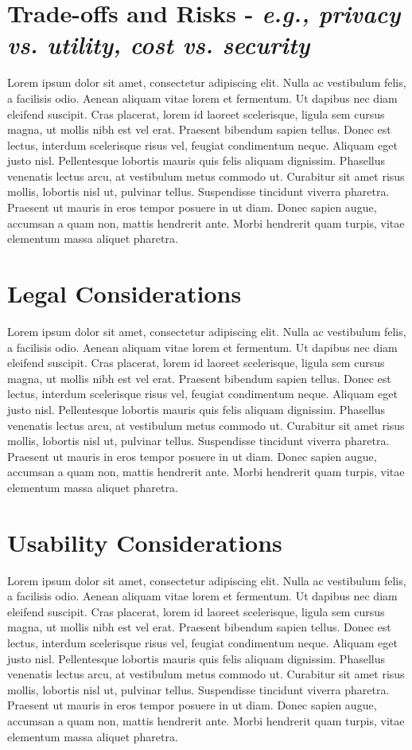 \documentclass[9pt]{extarticle}
\begin{document}
\section{Trade-offs and Risks - \textit{e.g., privacy vs. utility, cost vs. security}}
Lorem ipsum dolor sit amet, consectetur adipiscing elit. Nulla ac vestibulum felis, a facilisis odio. Aenean aliquam vitae lorem et fermentum. Ut dapibus nec diam eleifend suscipit. Cras placerat, lorem id laoreet scelerisque, ligula sem cursus magna, ut mollis nibh est vel erat. Praesent bibendum sapien tellus. Donec est lectus, interdum scelerisque risus vel, feugiat condimentum neque. Aliquam eget justo nisl. Pellentesque lobortis mauris quis felis aliquam dignissim. Phasellus venenatis lectus arcu, at vestibulum metus commodo ut. Curabitur sit amet risus mollis, lobortis nisl ut, pulvinar tellus. Suspendisse tincidunt viverra pharetra. Praesent ut mauris in eros tempor posuere in ut diam. Donec sapien augue, accumsan a quam non, mattis hendrerit ante. Morbi hendrerit quam turpis, vitae elementum massa aliquet pharetra. 

\section{Legal Considerations}
Lorem ipsum dolor sit amet, consectetur adipiscing elit. Nulla ac vestibulum felis, a facilisis odio. Aenean aliquam vitae lorem et fermentum. Ut dapibus nec diam eleifend suscipit. Cras placerat, lorem id laoreet scelerisque, ligula sem cursus magna, ut mollis nibh est vel erat. Praesent bibendum sapien tellus. Donec est lectus, interdum scelerisque risus vel, feugiat condimentum neque. Aliquam eget justo nisl. Pellentesque lobortis mauris quis felis aliquam dignissim. Phasellus venenatis lectus arcu, at vestibulum metus commodo ut. Curabitur sit amet risus mollis, lobortis nisl ut, pulvinar tellus. Suspendisse tincidunt viverra pharetra. Praesent ut mauris in eros tempor posuere in ut diam. Donec sapien augue, accumsan a quam non, mattis hendrerit ante. Morbi hendrerit quam turpis, vitae elementum massa aliquet pharetra. 

\section{Usability Considerations}
Lorem ipsum dolor sit amet, consectetur adipiscing elit. Nulla ac vestibulum felis, a facilisis odio. Aenean aliquam vitae lorem et fermentum. Ut dapibus nec diam eleifend suscipit. Cras placerat, lorem id laoreet scelerisque, ligula sem cursus magna, ut mollis nibh est vel erat. Praesent bibendum sapien tellus. Donec est lectus, interdum scelerisque risus vel, feugiat condimentum neque. Aliquam eget justo nisl. Pellentesque lobortis mauris quis felis aliquam dignissim. Phasellus venenatis lectus arcu, at vestibulum metus commodo ut. Curabitur sit amet risus mollis, lobortis nisl ut, pulvinar tellus. Suspendisse tincidunt viverra pharetra. Praesent ut mauris in eros tempor posuere in ut diam. Donec sapien augue, accumsan a quam non, mattis hendrerit ante. Morbi hendrerit quam turpis, vitae elementum massa aliquet pharetra.
\end{document}
